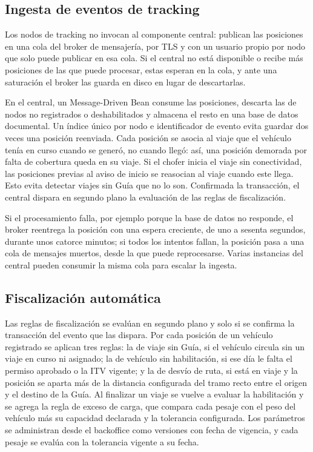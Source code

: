 \subsection{Ingesta de eventos de tracking}
Los nodos de tracking no invocan al componente central: publican las posiciones en una cola del broker de mensajería, por TLS y con un usuario propio por nodo que solo puede publicar en esa cola. Si el central no está disponible o recibe más posiciones de las que puede procesar, estas esperan en la cola, y ante una saturación el broker las guarda en disco en lugar de descartarlas.

En el central, un Message-Driven Bean consume las posiciones, descarta las de nodos no registrados o deshabilitados y almacena el resto en una base de datos documental. Un índice único por nodo e identificador de evento evita guardar dos veces una posición reenviada. Cada posición se asocia al viaje que el vehículo tenía en curso cuando se generó, no cuando llegó: así, una posición demorada por falta de cobertura queda en su viaje. Si el chofer inicia el viaje sin conectividad, las posiciones previas al aviso de inicio se reasocian al viaje cuando este llega. Esto evita detectar viajes sin Guía que no lo son. Confirmada la transacción, el central dispara en segundo plano la evaluación de las reglas de fiscalización.

Si el procesamiento falla, por ejemplo porque la base de datos no responde, el broker reentrega la posición con una espera creciente, de uno a sesenta segundos, durante unos catorce minutos; si todos los intentos fallan, la posición pasa a una cola de mensajes muertos, desde la que puede reprocesarse. Varias instancias del central pueden consumir la misma cola para escalar la ingesta.

\subsection{Fiscalización automática}
Las reglas de fiscalización se evalúan en segundo plano y solo si se confirma la transacción del evento que las dispara. Por cada posición de un vehículo registrado se aplican tres reglas: la de viaje sin Guía, si el vehículo circula sin un viaje en curso ni asignado; la de vehículo sin habilitación, si ese día le falta el permiso aprobado o la ITV vigente; y la de desvío de ruta, si está en viaje y la posición se aparta más de la distancia configurada del tramo recto entre el origen y el destino de la Guía. Al finalizar un viaje se vuelve a evaluar la habilitación y se agrega la regla de exceso de carga, que compara cada pesaje con el peso del vehículo más su capacidad declarada y la tolerancia configurada. Los parámetros se administran desde el backoffice como versiones con fecha de vigencia, y cada pesaje se evalúa con la tolerancia vigente a su fecha.

